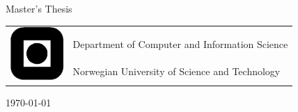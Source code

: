 \begin{titlepage}
\begin{center}

\vspace*{2cm}

\huge{\thesisTitle}


\vspace{.5cm}
\large{\thesisAuthor}



\vspace{1cm}


\vspace{1cm}
\huge{Master's Thesis}


\vspace{5cm}


\end{center}
\normalsize

\begin{table}[!h]
\begin{tabular}{ll}
\multirow{4}{*}{\includegraphics[width=20mm]{../img/logo}} & \\
& Department of Computer and Information Science \\
& Norwegian University of Science and Technology \\

\end{tabular}
\end{table}



\vspace{.2cm}


\begin{center}
\today
\end{center}

\end{titlepage}

\clearpage

\thispagestyle{empty}

\vspace*{12cm}

%
%
\clearpage


